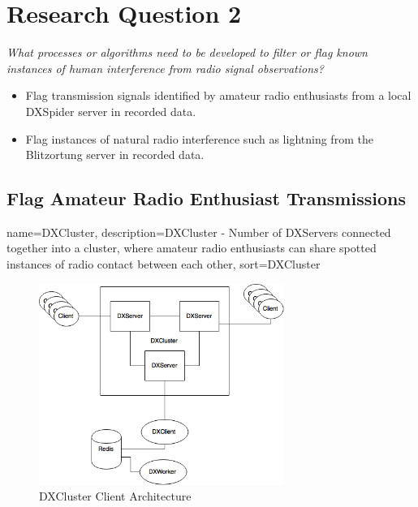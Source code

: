 \documentclass[runningheads,a4paper]{llncs}
\begin{document}
%
%
\chapter*{Research Question 2}

\textit{What processes or algorithms need to be developed to filter or flag known instances of human interference from radio signal observations?}

\begin{itemize}
	\item Flag transmission signals identified by amateur radio enthusiasts from a local DXSpider server in recorded data.
  	\item Flag instances of natural radio interference such as lightning from the Blitzortung server in recorded data.
\end{itemize}


\section*{Flag Amateur Radio Enthusiast Transmissions}

{
	name={DXCluster},
	description={DXCluster - Number of DXServers connected together into a cluster, where amateur radio enthusiasts can share spotted instances of radio contact between each other},
	sort=DXCluster
}

%
\begin{figure}[!htb]
	\centering
	\includegraphics[width=8cm]{images/72}
	\caption{DXCluster Client Architecture}
	\label{fig:dxcluster_client_architecture}
\end{figure}
%
\end{document}
